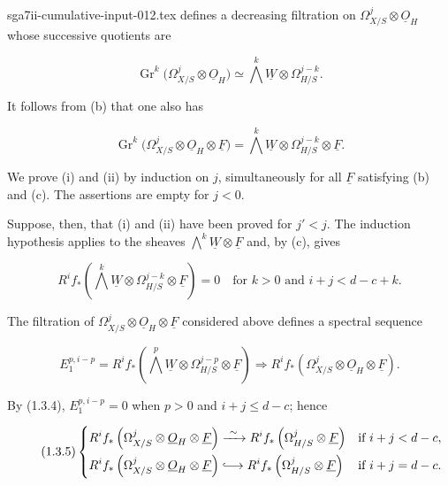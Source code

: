 \begin{filecontents*}{sga7ii-cumulative-input-012.tex}
defines a decreasing filtration on
$\Omega^j_{X/S}\otimes\underline O_H$ whose successive quotients are

\begin{equation}\tag{1.3.2}
\operatorname{Gr}^k\bigl(\Omega^j_{X/S}\otimes\underline O_H\bigr)
\simeq\bigwedge^k\underline W\otimes\Omega^{j-k}_{H/S}.
\end{equation}

It follows from (b) that one also has

\begin{equation}\tag{1.3.3}
\operatorname{Gr}^k\bigl(\Omega^j_{X/S}\otimes\underline O_H
\otimes\underline F\bigr)
=\bigwedge^k\underline W\otimes\Omega^{j-k}_{H/S}
\otimes\underline F.
\end{equation}

We prove (i) and (ii) by induction on $j$, simultaneously for all
$\underline F$ satisfying (b) and (c).  The assertions are empty for
$j<0$.


Suppose, then, that (i) and (ii) have been proved for $j'<j$.  The
induction hypothesis applies to the sheaves
$\bigwedge^k\underline W\otimes\underline F$ and, by (c), gives

\begin{equation}\tag{1.3.4}
R^if_*\left(\bigwedge^k\underline W\otimes
\Omega^{j-k}_{H/S}\otimes\underline F\right)=0
\quad\text{for }k>0\text{ and }i+j<d-c+k.
\end{equation}

The filtration of
$\Omega^j_{X/S}\otimes\underline O_H\otimes\underline F$ considered
above defines a spectral sequence

\begin{equation*}
E_1^{p,i-p}=R^if_*\left(\bigwedge^p\underline W\otimes
\Omega^{j-p}_{H/S}\otimes\underline F\right)
\Longrightarrow
R^if_*\left(\Omega^j_{X/S}\otimes\underline O_H
\otimes\underline F\right).
\end{equation*}

By (1.3.4), $E_1^{p,i-p}=0$ when $p>0$ and $i+j\leq d-c$; hence

\begin{equation}\tag{1.3.5}
\left\{
\begin{aligned}
R^if_*\left(\Omega^j_{X/S}\otimes\underline O_H\otimes\underline F\right)
&\xrightarrow{\ \sim\ }
R^if_*\left(\Omega^j_{H/S}\otimes\underline F\right)
&&\text{if }i+j<d-c,\\
R^if_*\left(\Omega^j_{X/S}\otimes\underline O_H\otimes\underline F\right)
&\lhook\joinrel\longrightarrow
R^if_*\left(\Omega^j_{H/S}\otimes\underline F\right)
&&\text{if }i+j=d-c.
\end{aligned}
\right.
\end{equation}


\end{filecontents*}
